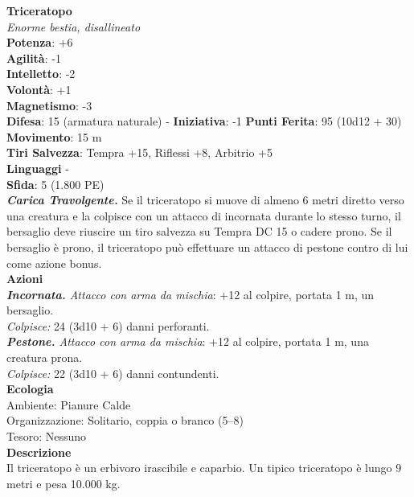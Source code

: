 \begin{multicols}{2}
\medskip\textbf{Triceratopo}\\
\emph{Enorme bestia, disallineato}\\
\textbf{Potenza}: +6\\
\textbf{Agilità}: -1\\
\textbf{Intelletto}: -2\\
\textbf{Volontà}: +1\\
\textbf{Magnetismo}: -3\\
\textbf{Difesa}: 15 (armatura naturale) - \textbf{Iniziativa}: -1
\textbf{Punti Ferita}: 95 (10d12 + 30)\\
\textbf{Movimento}: 15 m\\
\textbf{Tiri Salvezza}: Tempra +15, Riflessi +8, Arbitrio +5\\
\textbf{Linguaggi} -\\
\textbf{Sfida}: 5 (1.800 PE)\smallskip\\
\emph{\textbf{Carica Travolgente.}} Se il triceratopo si muove di almeno 6 metri diretto verso una creatura e la colpisce con un attacco di incornata durante lo stesso turno, il bersaglio deve riuscire un tiro salvezza su Tempra DC  15 o cadere prono. Se il bersaglio è prono, il triceratopo può effettuare un attacco di pestone contro di lui come azione bonus.\\
\smallskip\textbf{Azioni}\\
\emph{\textbf{Incornata.} Attacco con arma da mischia}: +12 al colpire, portata 1 m, un bersaglio.\\
\emph{Colpisce:} 24 (3d10 + 6) danni perforanti.\\
\emph{\textbf{Pestone.} Attacco con arma da mischia}: +12 al colpire, portata 1 m, una creatura prona.\\
\emph{Colpisce:} 22 (3d10 + 6) danni contundenti.\\
\textbf{Ecologia}\\
Ambiente: Pianure Calde\\
Organizzazione: Solitario, coppia o branco (5–8)\\
Tesoro: Nessuno\\
\textbf{Descrizione}\\
Il triceratopo è un erbivoro irascibile e caparbio. Un tipico triceratopo è lungo 9 metri e pesa 10.000 kg.\\


\end{multicols}
